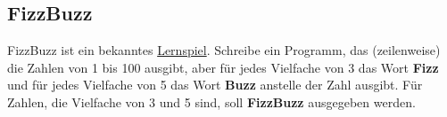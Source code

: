\subsection{FizzBuzz }
FizzBuzz ist ein bekanntes \href{https://en.wikipedia.org/wiki/Fizz_buzz}{Lernspiel}. Schreibe ein Programm, das (zeilenweise) die Zahlen von 1 bis 100 ausgibt, aber für jedes Vielfache von 3 das Wort \textbf{Fizz} und für jedes Vielfache von 5 das Wort \textbf{Buzz} anstelle der Zahl ausgibt. Für Zahlen, die Vielfache von 3 und 5 sind, soll \textbf{FizzBuzz} ausgegeben werden.
